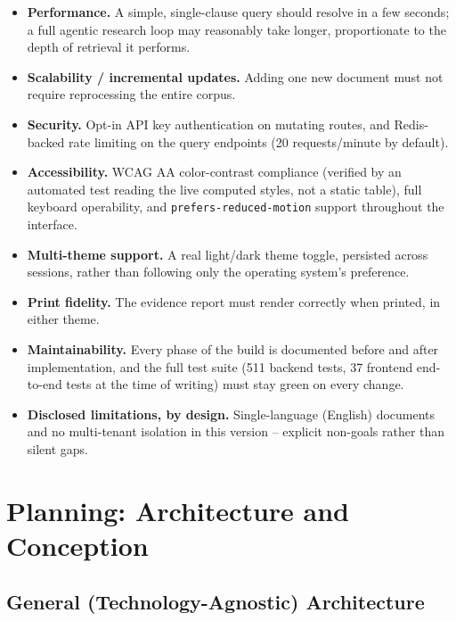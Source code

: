 \documentclass[12pt,a4paper]{report}
\begin{document}
\begin{itemize}
  \item \textbf{Performance.} A simple, single-clause query should resolve
        in a few seconds; a full agentic research loop may reasonably take
        longer, proportionate to the depth of retrieval it performs.
  \item \textbf{Scalability / incremental updates.} Adding one new document
        must not require reprocessing the entire corpus.
  \item \textbf{Security.} Opt-in \ac{API} key authentication on mutating
        routes, and Redis-backed rate limiting on the query endpoints
        (20 requests/minute by default).
  \item \textbf{Accessibility.} \ac{WCAG} AA color-contrast compliance
        (verified by an automated test reading the live computed styles,
        not a static table), full keyboard operability, and
        \texttt{prefers-reduced-motion} support throughout the interface.
  \item \textbf{Multi-theme support.} A real light/dark theme toggle,
        persisted across sessions, rather than following only the
        operating system's preference.
  \item \textbf{Print fidelity.} The evidence report must render correctly
        when printed, in either theme.
  \item \textbf{Maintainability.} Every phase of the build is documented
        before and after implementation, and the full test suite (511
        backend tests, 37 frontend end-to-end tests at the time of writing)
        must stay green on every change.
  \item \textbf{Disclosed limitations, by design.} Single-language (English)
        documents and no multi-tenant isolation in this version -- explicit
        non-goals rather than silent gaps.
\end{itemize}

\chapter{Planning: Architecture and Conception}

\section{General (Technology-Agnostic) Architecture}
\end{document}
